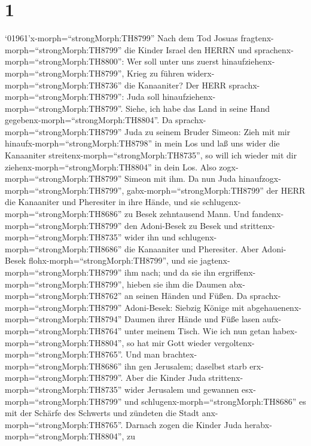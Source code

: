 \hypertarget{section}{%
\section{1}\label{section}}

 `01961'\textbar x-morph=``strongMorph:TH8799'' Nach dem Tod
Josuas fragtenx-morph=``strongMorph:TH8799'' die Kinder Israel den HERRN
und sprachenx-morph=``strongMorph:TH8800'': Wer soll unter uns zuerst
hinaufziehenx-morph=``strongMorph:TH8799'', Krieg zu führen
widerx-morph=``strongMorph:TH8736'' die Kanaaniter?  Der
HERR sprachx-morph=``strongMorph:TH8799'': Juda soll
hinaufziehenx-morph=``strongMorph:TH8799''. Siehe, ich habe das Land in
seine Hand gegebenx-morph=``strongMorph:TH8804''.  Da
sprachx-morph=``strongMorph:TH8799'' Juda zu seinem Bruder Simeon: Zieh
mit mir hinaufx-morph=``strongMorph:TH8798'' in mein Los und laß uns
wider die Kanaaniter streitenx-morph=``strongMorph:TH8735'', so will ich
wieder mit dir ziehenx-morph=``strongMorph:TH8804'' in dein Los. Also
zogx-morph=``strongMorph:TH8799'' Simeon mit ihm.  Da nun
Juda hinaufzogx-morph=``strongMorph:TH8799'',
gabx-morph=``strongMorph:TH8799'' der HERR die Kanaaniter und Pheresiter
in ihre Hände, und sie schlugenx-morph=``strongMorph:TH8686'' zu Besek
zehntausend Mann.  Und fandenx-morph=``strongMorph:TH8799''
den Adoni-Besek zu Besek und strittenx-morph=``strongMorph:TH8735''
wider ihn und schlugenx-morph=``strongMorph:TH8686'' die Kanaaniter und
Pheresiter.  Aber Adoni-Besek
flohx-morph=``strongMorph:TH8799'', und sie
jagtenx-morph=``strongMorph:TH8799'' ihm nach; und da sie ihn
ergriffenx-morph=``strongMorph:TH8799'', hieben sie ihm die Daumen
abx-morph=``strongMorph:TH8762'' an seinen Händen und Füßen.
 Da sprachx-morph=``strongMorph:TH8799'' Adoni-Besek:
Siebzig Könige mit abgehauenenx-morph=``strongMorph:TH8794'' Daumen
ihrer Hände und Füße lasen aufx-morph=``strongMorph:TH8764'' unter
meinem Tisch. Wie ich nun getan habex-morph=``strongMorph:TH8804'', so
hat mir Gott wieder vergoltenx-morph=``strongMorph:TH8765''. Und man
brachtex-morph=``strongMorph:TH8686'' ihn gen Jerusalem; daselbst starb
erx-morph=``strongMorph:TH8799''.  Aber die Kinder Juda
strittenx-morph=``strongMorph:TH8735'' wider Jerusalem und gewannen
esx-morph=``strongMorph:TH8799'' und
schlugenx-morph=``strongMorph:TH8686'' es mit der Schärfe des Schwerts
und zündeten die Stadt anx-morph=``strongMorph:TH8765''. 
Darnach zogen die Kinder Juda herabx-morph=``strongMorph:TH8804'', zu
